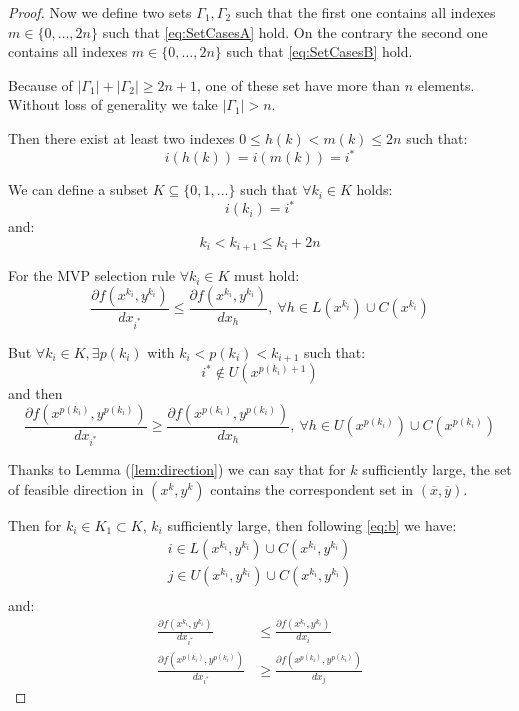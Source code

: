 \begin{proof}
Now we define two sets $\Gamma_1,\Gamma_2$ such that the first one contains all indexes $m \in\{0,\ldots,2n\}$ such that \ref{eq:SetCasesA} hold.
On the contrary the second one contains all indexes $m \in\{0,\ldots,2n\}$ such that \ref{eq:SetCasesB} hold.

Because of $|\Gamma_1|+|\Gamma_2|\ge2n+1$, one of these set have more than $n$ elements. Without loss of generality we take $|\Gamma_1|> n$.

Then there exist at least two indexes $0\le h(k)< m(k)\le 2n$ such that:
\begin{equation}
 i(h(k))=i(m(k))=i^*
\end{equation}

We can define a subset $K \subseteq \{0,1,\ldots\}$ such that $\forall k_i \in K$ holds:
\begin{equation}
 i(k_i)=i^*
\end{equation}
and:
\begin{equation}
 k_i <k_{i+1} \le k_i+2n
\end{equation}

For the MVP selection rule $\forall k_i \in K$ must hold:
\begin{equation}
 \frac{\partial f(x^{k_i},y^{k_i})}{dx_{i^*}} \le \frac{\partial f(x^{k_i},y^{k_i})}{dx_{h}}, \ \forall h \in L(x^{k_i}) \cup C(x^{k_i})
\end{equation}

But  $\forall k_i \in K,\exists p(k_i)$ with  $k_i <p(k_i)<k_{i+1}$ such that:
\begin{equation}
 i^* \not \in U(x^{p(k_i)+1})
\end{equation}
and then
\begin{equation}
 \frac{\partial f(x^{p(k_i)},y^{p(k_i)})}{dx_{i^*}} \ge \frac{\partial f(x^{p(k_i)},y^{p(k_i)})}{dx_{h}}, \ \forall h \in U(x^{p(k_i)}) \cup C(x^{p(k_i)})
\end{equation}


Thanks to Lemma (\ref{lem:direction}) we can say that for $k$ sufficiently large, the set of feasible direction in $(x^k,y^k)$ contains the correspondent set in $(\overline{x},\overline{y})$.

Then for $k_i \in K_1 \subset K$, $k_i$ sufficiently large, then following \ref{eq:b} we have:
\begin{equation}
\begin{aligned}
i \in L(x^{k_i},y^{k_i}) \cup C(x^{k_i},y^{k_i})\\
j \in U(x^{k_i},y^{k_i}) \cup C(x^{k_i},y^{k_i})\\
\end{aligned}
\end{equation}
and:
\begin{equation}\label{eq:direction1}
\begin{aligned}
 \frac{\partial f(x^{k_i},y^{k_i})}{dx_{i^*}} &\le \frac{\partial f(x^{k_i},y^{k_i})}{dx_{i}}\\
 \frac{\partial f(x^{p(k_i)},y^{p(k_i)})}{dx_{i^*}} &\ge \frac{\partial f(x^{p(k_i)},y^{p(k_i)})}{dx_{j}}
 \end{aligned}
\end{equation}


\end{proof}

